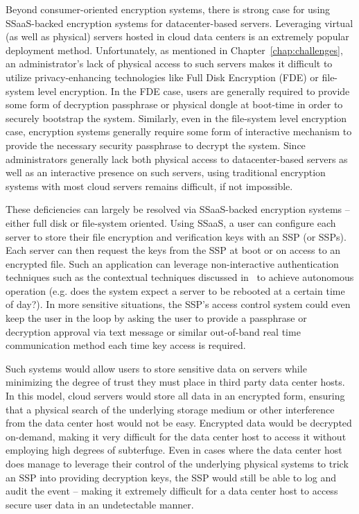 Beyond consumer-oriented encryption systems, there is strong case for
using SSaaS-backed encryption systems for datacenter-based
servers. Leveraging virtual (as well as physical) servers hosted in
cloud data centers is an extremely popular deployment
method. Unfortunately, as mentioned in Chapter~\ref{chap:challenges},
an administrator's lack of physical access to such servers makes it
difficult to utilize privacy-enhancing technologies like Full Disk
Encryption (FDE) or file-system level encryption. In the FDE case,
users are generally required to provide some form of decryption
passphrase or physical dongle at boot-time in order to securely
bootstrap the system. Similarly, even in the file-system level
encryption case, encryption systems generally require some form of
interactive mechanism to provide the necessary security passphrase to
decrypt the system. Since administrators generally lack both physical
access to datacenter-based servers as well as an interactive presence
on such servers, using traditional encryption systems with most cloud
servers remains difficult, if not impossible.

These deficiencies can largely be resolved via SSaaS-backed encryption
systems -- either full disk or file-system oriented. Using SSaaS, a
user can configure each server to store their file encryption and
verification keys with an SSP (or SSPs). Each server can then request
the keys from the SSP at boot or on access to an encrypted file. Such
an application can leverage non-interactive authentication techniques
such as the contextual techniques discussed in~\cite{hulsebosch2005}
to achieve autonomous operation (e.g. does the system expect a server
to be rebooted at a certain time of day?). In more sensitive
situations, the SSP's access control system could even keep the user
in the loop by asking the user to provide a passphrase or decryption
approval via text message or similar out-of-band real time
communication method each time key access is required.

Such systems would allow users to store sensitive data on servers
while minimizing the degree of trust they must place in third party
data center hosts. In this model, cloud servers would store all data
in an encrypted form, ensuring that a physical search of the
underlying storage medium or other interference from the data center
host would not be easy. Encrypted data would be decrypted on-demand,
making it very difficult for the data center host to access it without
employing high degrees of subterfuge. Even in cases where the data
center host does manage to leverage their control of the underlying
physical systems to trick an SSP into providing decryption keys, the
SSP would still be able to log and audit the event -- making it
extremely difficult for a data center host to access secure user data
in an undetectable manner.

